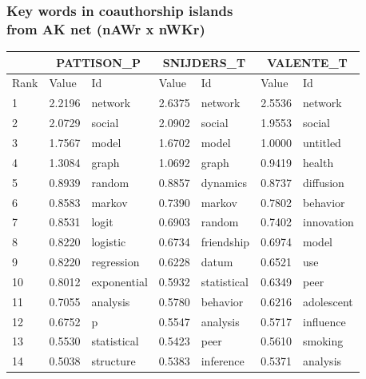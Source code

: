 \documentclass[hyperref={pdfstartview={FitBH -32768},
                         pdfpagemode=FullScreen,
                         plainpages=false,
                         colorlinks=true}
              ]{beamer}
\begin{document}
\begin{frame}[fragile]
\frametitle{Key words in coauthorship islands \\ \normalsize from AK net (nAWr x nWKr)}

\scriptsize
\renewcommand{\arraystretch}{0.84}
\begin{center}
\begin{tabular}{p{0.5cm}|p{0.8cm}|p{1.7cm}||p{0.8cm}|p{1.4cm}||p{0.8cm}|p{1.6cm}} \hline \hline    
 & \multicolumn{2}{c}{PATTISON\_P} &  \multicolumn{2}{c}{SNIJDERS\_T}	  & 	 \multicolumn{2}{c}{VALENTE\_T} \\ \hline\hline
        Rank   &   Value  & Id		    & 	   Value  & Id		       &	 Value  & Id	    \\ \hline
           1   & 	2.2196  &  network	    & 	2.6375  &	 network	    &	    2.5536  &	 network	   \\
           2   & 	2.0729  &  social	    &	2.0902  &	 social		    &	    1.9553  &	 social	   \\
           3   & 	1.7567  &  model	    &	1.6702  &	 model		    &	    1.0000  &	 untitled	   \\
           4   & 	1.3084  &  graph	    &	1.0692  &	 graph		    &	    0.9419  &	 health	   \\
           5   & 	0.8939  &  random	    &	0.8857  &	 dynamics	    &	    0.8737  &	 diffusion	   \\
           6   & 	0.8583  &  markov	    &	0.7390  &	 markov		    &	    0.7802  &	 behavior	   \\
           7   & 	0.8531  &  logit	    &	0.6903  &	 random		    &	    0.7402  &	 innovation	   \\
           8   & 	0.8220  &  logistic	    &	0.6734  &	 friendship	    &	    0.6974  &	 model	   \\
           9   & 	0.8220  &  regression	    &	0.6228  &	 datum		    &	    0.6521  &	 use	   \\
          10   & 	0.8012  &  exponential	    &	0.5932  &	 statistical	    &	    0.6349  &	 peer	   \\
          11   & 	0.7055  &  analysis	    &	0.5780  &	 behavior	    &	    0.6216  &	 adolescent	   \\
          12   & 	0.6752  &  p		    &	0.5547  &	 analysis	    &	    0.5717  &	 influence	   \\
          13   & 	0.5530  &  statistical	    &	0.5423  &	 peer		    &	    0.5610  &	 smoking	   \\
          14   & 	0.5038  &  structure	    &	0.5383  &	 inference	    &	    0.5371  &	 analysis	   \\

\end{tabular}
\end{center}
\end{frame}
\end{document}
